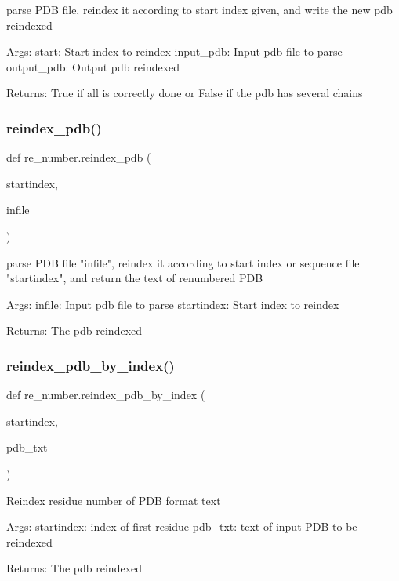 \begin{DoxyVerb}parse PDB file, reindex it according to start index given,
and write the new pdb reindexed

Args:
    start: Start index to reindex
    input_pdb: Input pdb file to parse
    output_pdb: Output pdb reindexed

Returns:
    True if all is correctly done or False if the pdb has several chains
\end{DoxyVerb}
 \mbox{\label{namespacere__number_a6245d598e99bf633464ce7c89f6a1567}} 
\subsubsection{\texorpdfstring{reindex\+\_\+pdb()}{reindex\_pdb()}}
{\footnotesize\ttfamily def re\+\_\+number.\+reindex\+\_\+pdb (\begin{DoxyParamCaption}\item[{}]{startindex,  }\item[{}]{infile }\end{DoxyParamCaption})}

\begin{DoxyVerb}parse PDB file "infile", reindex it according to start index or
sequence file "startindex", and return the text of renumbered PDB

Args:
    infile: Input pdb file to parse
    startindex: Start index to reindex

Returns:
    The pdb reindexed
\end{DoxyVerb}
 \mbox{\label{namespacere__number_ad7814641c4d9c9eb46a7aac1d4bdbc91}} 
\subsubsection{\texorpdfstring{reindex\+\_\+pdb\+\_\+by\+\_\+index()}{reindex\_pdb\_by\_index()}}
{\footnotesize\ttfamily def re\+\_\+number.\+reindex\+\_\+pdb\+\_\+by\+\_\+index (\begin{DoxyParamCaption}\item[{}]{startindex,  }\item[{}]{pdb\+\_\+txt }\end{DoxyParamCaption})}

\begin{DoxyVerb}Reindex residue number of PDB format text

Args:
    startindex: index of first residue
    pdb_txt:    text of input PDB to be reindexed

Returns:
    The pdb reindexed
\end{DoxyVerb}
 